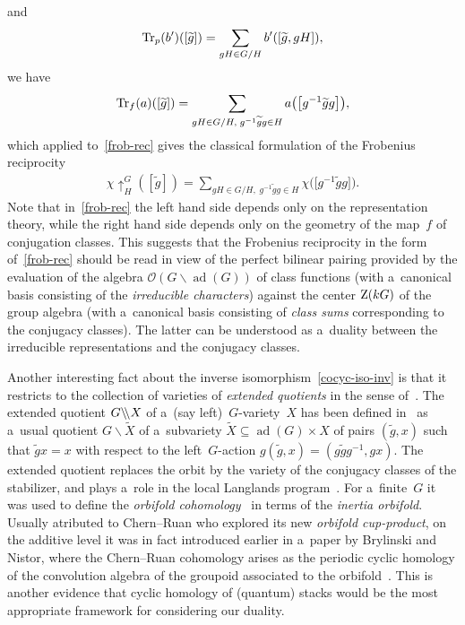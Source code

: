 \documentclass[pdftex]{sigma}
\numberwithin{equation}{section}
\DeclareMathOperator{\ad}{ad}
\begin{document}
and
\begin{gather*}%
{\rm Tr}_{p}(b')([\widetilde{g}])=\sum\limits_{gH\in G/H}b'([\widetilde{g}, gH]),
\end{gather*}
we have
\begin{gather*}%
{\rm Tr}_{f}(a)([\widetilde{g}])=\sum\limits_{gH\in G/H,\; g^{-1}\widetilde{g}g\in H} a\big(\big[g^{-1}\widetilde{g}g\big]\big),
\end{gather*}
which applied to~\eqref{frob-rec} gives the classical formulation of the Frobenius reciprocity
\begin{gather*}%
\chi\uparrow^{G}_{H}([\widetilde{g}])=\sum\limits_{gH\in G/H,\; g^{-1}\widetilde{g}g\in H} \chi\big(\big[g^{-1}\widetilde{g}g\big]\big).
\end{gather*}
Note that in~\eqref{frob-rec} the left hand side depends only on the representation theory, while the right hand side
depends only on the geometry of the map~$f$ of conjugation classes.
This suggests that the Frobenius reciprocity in the form of~\eqref{frob-rec} should be read in view of the perfect
bilinear pairing provided by the evaluation of the algebra ${\mathscr O}(G\backslash \ad(G))$ of class functions
(with a~canonical basis consisting of the \emph{irreducible characters}) against the center ${\rm Z}(kG)$ of the group
algebra (with a~canonical basis consisting of \emph{class sums} corresponding to the conjugacy classes).
The latter can be understood as a~duality between the irreducible representations and the conjugacy classes.

Another interesting fact about the inverse isomorphism~\eqref{cocyc-iso-inv} is that it restricts to the collection of
varieties of \emph{extended quotients} in the sense of~\cite{AubeBaumPlymSoll14}.
The extended quotient $G\backslash\hspace{-0.23em}\backslash X$ of a~(say left)~$G$-variety~$X$ has been def\/ined
in~\cite{AubeBaumPlymSoll14} as a~usual quotient $G\backslash \widetilde{X}$ of a~subvariety $\widetilde{X}\subseteq
\ad(G)\times X$ of pairs $(\widetilde{g}, x)$ such that $\widetilde{g}x =x$ with respect to the left~$G$-action
$g(\widetilde{g}, x)=(g\widetilde{g}g^{-1}, gx)$.
The extended quotient replaces the orbit by the variety of the conjugacy classes of the stabilizer, and plays a~role in
the local Langlands program~\cite{AubeBaumPlymSoll14}.
For a~f\/inite~$G$ it was used to def\/ine the \emph{orbifold cohomology}~\cite{ChenRuan04} in terms of the \emph{inertia
orbifold}.
Usually atributed to Chern--Ruan who explored its new \emph{orbifold cup-product}, on the additive level it was in fact
introduced earlier in a~paper by Brylinski and Nistor, where the Chern--Ruan cohomology arises as the periodic cyclic
homology of the convolution algebra of the groupoid associated to the orbifold~\cite[Corollary~5.10(ii)]{BrylNist94}.
This is another evidence that cyclic homology of (quantum) stacks would be the most appropriate framework for
considering our duality.
\end{document}
